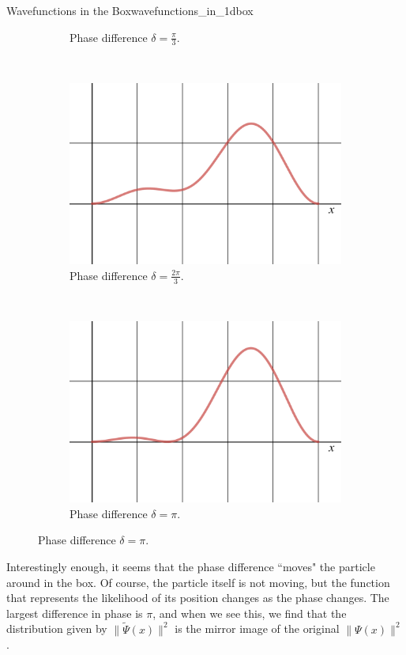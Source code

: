 \begin{ex}{Wavefunctions in the Box}{wavefunctions_in_1dbox}
\begin{figure}[H]
\begin{subfigure}[h]{0.49\textwidth}
			\caption{Phase difference $\delta=\frac{\pi}{3}$.}
		\end{subfigure}
		\\
		\begin{subfigure}[h]{0.49\textwidth}
			\centering
			\includegraphics[width=.8\textwidth]{Figures_Part_5/prob_Psi_3pi4.png}
			\caption{Phase difference $\delta=\frac{2\pi}{3}$.}
		\end{subfigure}
		~
		\begin{subfigure}[h]{0.49\textwidth}
			\centering
			\includegraphics[width=.8\textwidth]{Figures_Part_5/prob_Psi_pi.png}
			\caption{Phase difference $\delta=\pi$.}
		\end{subfigure}
	\end{figure}
	 Interestingly enough, it seems that the phase difference ``moves" the particle around in the box. Of course, the particle itself is not moving, but the function that represents the likelihood of its position changes as the phase changes.  The largest difference in phase is $\pi$, and when we see this, we find that the distribution given by $\|\tilde{\Psi}(x)\|^2$ is the mirror image of the original $\|\Psi(x)\|^2$.  


\end{ex}

